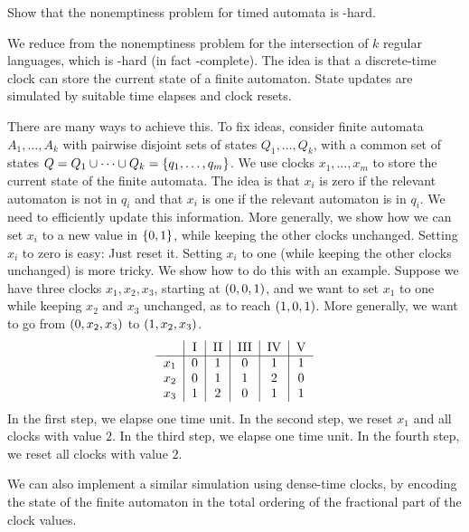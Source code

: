 \begin{exercise}
    Show that the nonemptiness problem for timed automata is \PSPACE-hard.
\end{exercise}
\begin{solution}
    We reduce from the nonemptiness problem for the intersection of $k$ regular languages,
    which is \PSPACE-hard (in fact \PSPACE-complete).
    The idea is that a discrete-time clock can store the current state of a finite automaton.
    State updates are simulated by suitable time elapses and clock resets.

    There are many ways to achieve this.
    To fix ideas, consider finite automata $A_1, \dots, A_k$ with pairwise disjoint sets of states $Q_1, \dots, Q_k$,
    with a common set of states $Q = Q_1 \cup \cdots \cup Q_k = \left\{q_1, \dots, q_m\right\}$.
    We use clocks $x_1, \dots, x_m$ to store the current state of the finite automata.
    The idea is that $x_i$ is zero if the relevant automaton is not in $q_i$
    and that $x_i$ is one if the relevant automaton is in $q_i$.
    We need to efficiently update this information.
    More generally, we show how we can set $x_i$ to a new value in $\left\{0, 1\right\}$,
    while keeping the other clocks unchanged.
    Setting $x_i$ to zero is easy: Just reset it.
    Setting $x_i$ to one (while keeping the other clocks unchanged) is more tricky.
    We show how to do this with an example.
    Suppose we have three clocks $x_1, x_2, x_3$, starting at $\left( 0, 0, 1 \right)$,
    and we want to set $x_1$ to one while keeping $x_2$ and $x_3$ unchanged,
    as to reach $\left( 1, 0, 1 \right)$.
    More generally, we want to go from $\left( 0, x_2, x_3 \right)$ to $\left( 1, x_2, x_3 \right)$.
    \begin{equation*}
        \begin{tabular}{c|c|c|c|c|c}
                & I & II & III & IV & V\\
        \hline
        $x_1$   & 0 & 1  & 0   & 1  & 1 \\
        $x_2$   & 0 & 1  & 1   & 2  & 0 \\
        $x_3$   & 1 & 2  & 0   & 1  & 1
        \end{tabular}
    \end{equation*}
    In the first step, we elapse one time unit.
    In the second step, we reset $x_1$ and all clocks with value $2$.
    In the third step, we elapse one time unit.
    In the fourth step, we reset all clocks with value $2$.

    We can also implement a similar simulation using dense-time clocks,
    by encoding the state of the finite automaton in the total ordering of the fractional part of the clock values.
\end{solution}

